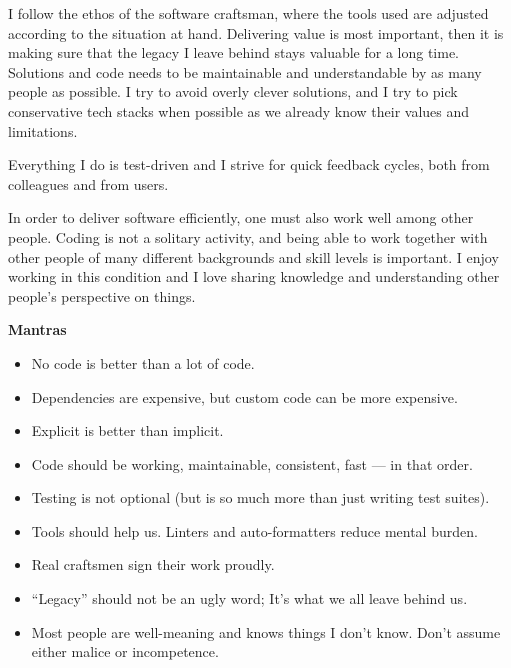 \documentclass[9pt]{developercv} %
\begin{document}
\begin{minipage}[t]{0.4\textwidth} %
  \vspace{-\baselineskip}

  I follow the ethos of the software craftsman, where the tools used are
  adjusted according to the situation at hand. Delivering value is most
  important, then it is making sure that the legacy I leave behind stays
  valuable for a long time. Solutions and code needs to be maintainable and
  understandable by as many people as possible. I try to avoid overly clever
  solutions, and I try to pick conservative tech stacks when possible as we
  already know their values and limitations.

  Everything I do is test-driven and I strive for quick feedback cycles, both
  from colleagues and from users.

  In order to deliver software efficiently, one must also work well among other
  people. Coding is not a solitary activity, and being able to work together
  with other people of many different backgrounds and skill levels is
  important. I enjoy working in this condition and I love sharing knowledge and
  understanding other people's perspective on things.
\end{minipage}
\hfill
\begin{minipage}[t]{0.5\textwidth}
  \vspace{-\baselineskip}
  \textbf{Mantras}
  \begin{itemize}
      \item No code is better than a lot of code.
      \item Dependencies are expensive, but custom code can be more expensive.
      \item Explicit is better than implicit.
      \item Code should be working, maintainable, consistent, fast --- in that order.
      \item Testing is not optional (but is so much more than just writing test suites).
      \item Tools should help us. Linters and auto-formatters reduce mental burden.
      \item Real craftsmen sign their work proudly.
      \item ``Legacy'' should not be an ugly word; It's what we all leave behind us.
      \item Most people are well-meaning and knows things I don't know. Don't
        assume either malice or incompetence.
  \end{itemize}
\end{minipage}
\end{document}
